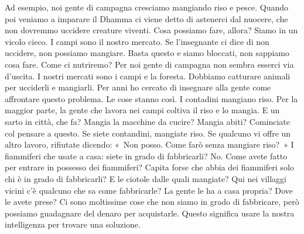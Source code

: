 Ad esempio, noi gente di campagna cresciamo mangiando riso e pesce.
Quando poi veniamo a imparare il Dhamma ci viene detto di astenerci dal
nuocere, che non dovremmo uccidere creature viventi. Cosa possiamo fare,
allora? Siamo in un vicolo cieco. I campi sono il nostro mercato. Se
l'insegnante ci dice di non uccidere, non possiamo mangiare. Basta
questo e siamo bloccati, non sappiamo cosa fare. Come ci nutriremo? Per
noi gente di campagna non sembra esserci via d'uscita. I nostri mercati
sono i campi e la foresta. Dobbiamo catturare animali per ucciderli e
mangiarli. Per anni ho cercato di insegnare alla gente come affrontare
questo problema. Le cose stanno così. I contadini mangiano riso. Per la
maggior parte, la gente che lavora nei campi coltiva il riso e lo
mangia. E un sarto in città, che fa? Mangia la macchine da cucire?
Mangia abiti? Cominciate col pensare a questo. Se siete contandini,
mangiate riso. Se qualcuno vi offre un altro lavoro, rifiutate dicendo:
«~Non posso. Come farò senza mangiare riso?~» I fiammiferi che usate a
casa: siete in grado di fabbricarli? No. Come avete fatto per entrare in
possesso dei fiammiferi? Capita forse che abbia dei fiammiferi solo chi
è in grado di fabbricarli? E le ciotole dalle quali mangiate? Qui nei
villaggi vicini c'è qualcuno che sa come fabbricarle? La gente le ha a
casa propria? Dove le avete prese? Ci sono moltissime cose che non siamo
in grado di fabbricare, però possiamo guadagnare del denaro per
acquistarle. Questo significa usare la nostra intelligenza per trovare
una soluzione.

